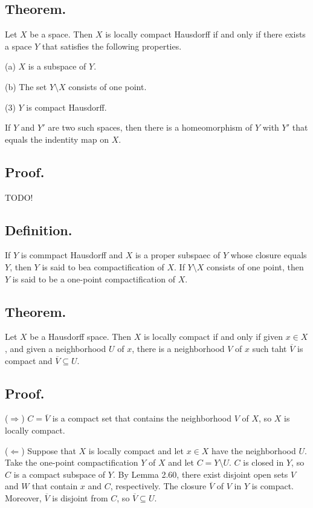 \documentclass[titlepage]{article}
\begin{document}
\subsection{Theorem.} Let $X$ be a space. Then $X$ is locally compact Hausdorff if and only if there exists a space $Y$ that satisfies the following properties.

(a) $X$ is a subspace of $Y$.

(b) The set $Y \setminus X$ consists of one point.

(3) $Y$ is compact Hausdorff.

If $Y$ and $Y'$ are two such spaces, then there is a homeomorphism of $Y$ with $Y'$ that equals the indentity map on $X$.

\subsection{Proof.} TODO!

\subsection{Definition.} If $Y$ is commpact Hausdorff and $X$ is a proper subspaec of $Y$ whose closure equals $Y$, then $Y$ is said to bea compactification of $X$. If $Y \setminus X$ consists of one point, then $Y$ is said to be a one-point compactification of $X$.

\subsection{Theorem.} Let $X$ be a Hausdorff space. Then $X$ is locally compact if and only if given $x \in X$, and given a neighborhood $U$ of $x$, there is a neighborhood $V$ of $x$ such taht $\overline{V}$ is compact and $\overline{V} \subseteq U$.

\subsection{Proof.}

($\Rightarrow$) $C = \overline{V}$ is a compact set that contains the neighborhood $V$ of $X$, so $X$ is locally compact.

($\Leftarrow$) Suppose that $X$ is locally compact and let $x \in X$ have the neighborhood $U$. Take the one-point compactification $Y$ of $X$ and let $C = Y \setminus U$. $C$ is closed in $Y$, so $C$ is a compact subspace of $Y$. By Lemma 2.60, there exist disjoint open sets $V$ and $W$ that contain $x$ and $C$, respectively. The closure $\overline{V}$ of $V$ in $Y$ is compact. Moreover, $\overline{V}$ is disjoint from $C$, so $\overline{V} \subseteq U$.
\end{document}
